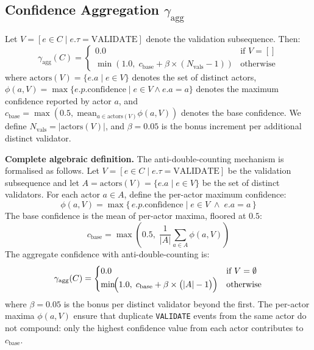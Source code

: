 \subsection{Confidence Aggregation $\gamma_{\text{agg}}$}

Let $V = [e \in C \mid e.\tau = \text{VALIDATE}]$ denote the validation subsequence. Then:
\begin{equation}
    \gamma_{\text{agg}}(C) = \begin{cases}
        0.0 & \text{if } V = [] \\
        \min(1.0,\; c_{\text{base}} + \beta \times (N_{\text{vals}} - 1)) & \text{otherwise}
    \end{cases}
\end{equation}
where $\text{actors}(V) = \{e.a \mid e \in V\}$ denotes the set of distinct actors, $\phi(a, V) = \max\{e.p.\text{confidence} \mid e \in V \land e.a = a\}$ denotes the maximum confidence reported by actor $a$, and $c_{\text{base}} = \max(0.5,\; \text{mean}_{a \in \text{actors}(V)} \phi(a, V))$ denotes the base confidence. We define $N_{\text{vals}} = |\text{actors}(V)|$, and $\beta = 0.05$ is the bonus increment per additional distinct validator.

\textbf{Complete algebraic definition.} The anti-double-counting mechanism is formalised as follows. Let $V = [e \in C \mid e.\tau = \text{VALIDATE}]$ be the validation subsequence and let $A = \text{actors}(V) = \{e.a \mid e \in V\}$ be the set of distinct validators. For each actor $a \in A$, define the per-actor maximum confidence:
\begin{equation}
    \phi(a, V) = \max\{\,e.p.\text{confidence} \mid e \in V \;\land\; e.a = a\,\}
\end{equation}
The base confidence is the mean of per-actor maxima, floored at $0.5$:
\begin{equation}
    c_{\text{base}} = \max\!\left(0.5,\; \frac{1}{|A|}\sum_{a \in A} \phi(a, V)\right)
\end{equation}
The aggregate confidence with anti-double-counting is:
\begin{equation}
    \gamma_{\text{agg}}(C) = \begin{cases}
        0.0 & \text{if } V = \emptyset \\
        \min\!\Bigl(1.0,\; c_{\text{base}} + \beta \times \bigl(|A| - 1\bigr)\Bigr) & \text{otherwise}
    \end{cases}
\end{equation}
where $\beta = 0.05$ is the bonus per distinct validator beyond the first. The per-actor maxima $\phi(a, V)$ ensure that duplicate \texttt{VALIDATE} events from the same actor do not compound: only the highest confidence value from each actor contributes to $c_{\text{base}}$.

